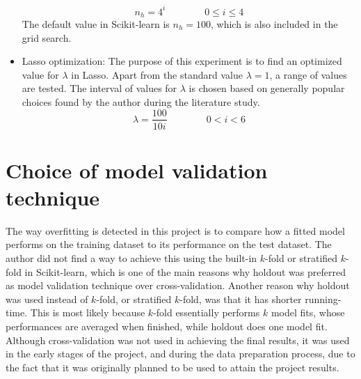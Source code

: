\begin{itemize}
			\begin{equation}
				n_h = 4^i \qquad \qquad 0 \leq i \leq 4
			\end{equation}
			The default value in Scikit-learn is $n_h = 100$, which is also included in the grid search.
		\item{Lasso optimization: } The purpose of this experiment is to find an optimized value for $\lambda$ in Lasso. Apart from the standard value $\lambda = 1$, a range of values are tested. The interval of values for $\lambda$ is chosen based on generally popular choices found by the author during the literature study.
			\begin{equation}
				\lambda = \frac{100}{10i} \qquad \qquad 0 < i < 6
			\end{equation} 
	\end{itemize}

\section{Choice of model validation technique}


The way overfitting is detected in this project is to compare how a fitted model performs on the training dataset to its performance on the test dataset. The author did not find a way to achieve this using the built-in $k$-fold or stratified $k$-fold in Scikit-learn, which is one of the main reasons why holdout was preferred as model validation technique over cross-validation. Another reason why holdout was used instead of $k$-fold, or stratified $k$-fold, was that it has shorter running-time. This is most likely because $k$-fold essentially performs $k$ model fits, whose performances are averaged when finished, while holdout does one model fit. Although cross-validation was not used in achieving the final results, it was used in the early stages of the project, and during the data preparation process, due to the fact that it was originally planned to be used to attain the project results. 

